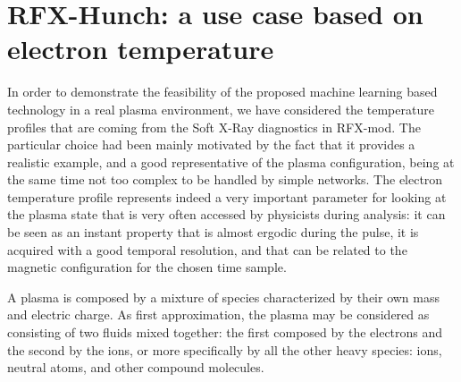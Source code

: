 \chapter{RFX-Hunch: a use case based on electron temperature}
\label{section:RFXhunch}

In order to demonstrate the feasibility of the proposed machine learning based technology in a real plasma environment,
we have considered the temperature profiles that are coming from the Soft X-Ray diagnostics in RFX-mod. The particular choice had been mainly motivated by the fact that it provides a realistic example, and a good representative of the plasma configuration, being at the same time not too complex to be handled by simple networks. The electron temperature profile represents indeed a very important parameter for looking at the plasma state that is very often accessed by physicists during analysis: it can be seen as an instant property that is almost ergodic during the pulse, it is acquired with a good temporal resolution, and that can be related to the magnetic configuration for the chosen time sample.

A plasma is composed by a mixture of species characterized by their own mass and electric charge. As first approximation, the plasma may be considered as consisting of two fluids mixed together: the first composed by the electrons and the second by the ions, or more specifically by all the other heavy species: ions, neutral atoms, and other compound molecules.

